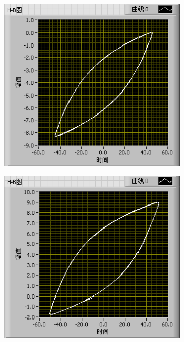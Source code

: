 \documentclass{ctexart}
\begin{document}
\begin{figure}[H]
  \centering
  \begin{subfigure}{0.32\linewidth}
    \includegraphics[width=\linewidth]{LabVIEW使用基础/铁材料的磁滞现象和磁滞回线/7V.png}
  \end{subfigure}
  \begin{subfigure}{0.32\linewidth}
    \includegraphics[width=\linewidth]{LabVIEW使用基础/铁材料的磁滞现象和磁滞回线/8V.png}

\end{subfigure}
\end{figure}
\end{document}
